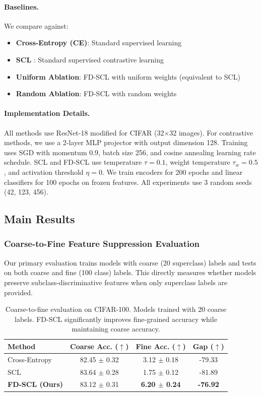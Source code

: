 \documentclass[11pt,a4paper]{article}
\begin{document}
\paragraph{Baselines.}
We compare against:
\begin{itemize}
    \item \textbf{Cross-Entropy (CE)}: Standard supervised learning
    \item \textbf{SCL} \citep{khosla2020supervised}: Standard supervised contrastive learning
    \item \textbf{Uniform Ablation}: FD-SCL with uniform weights (equivalent to SCL)
    \item \textbf{Random Ablation}: FD-SCL with random weights
\end{itemize}

\paragraph{Implementation Details.}
All methods use ResNet-18 \citep{he2016deep} modified for CIFAR (32$\times$32 images). For contrastive methods, we use a 2-layer MLP projector with output dimension 128. Training uses SGD with momentum 0.9, batch size 256, and cosine annealing learning rate schedule. SCL and FD-SCL use temperature $\tau = 0.1$, weight temperature $\tau_w = 0.5$, and activation threshold $\eta = 0$. We train encoders for 200 epochs and linear classifiers for 100 epochs on frozen features. All experiments use 3 random seeds (42, 123, 456).

\subsection{Main Results}

\subsubsection{Coarse-to-Fine Feature Suppression Evaluation}

Our primary evaluation trains models with coarse (20 superclass) labels and tests on both coarse and fine (100 class) labels. This directly measures whether models preserve subclass-discriminative features when only superclass labels are provided.

\begin{table}[t]
\caption{Coarse-to-fine evaluation on CIFAR-100. Models trained with 20 coarse labels. FD-SCL significantly improves fine-grained accuracy while maintaining coarse accuracy.}
\label{tab:coarse-fine}
\centering
\begin{tabular}{lccc}
\toprule
Method & Coarse Acc. ($\uparrow$) & Fine Acc. ($\uparrow$) & Gap ($\uparrow$) \\
\midrule
Cross-Entropy & 82.45 $\pm$ 0.32 & 3.12 $\pm$ 0.18 & -79.33 \\
SCL \citep{khosla2020supervised} & 83.64 $\pm$ 0.28 & 1.75 $\pm$ 0.12 & -81.89 \\
\textbf{FD-SCL (Ours)} & 83.12 $\pm$ 0.31 & \textbf{6.20 $\pm$ 0.24} & \textbf{-76.92} \\
\bottomrule
\end{tabular}
\end{table}
\end{document}

